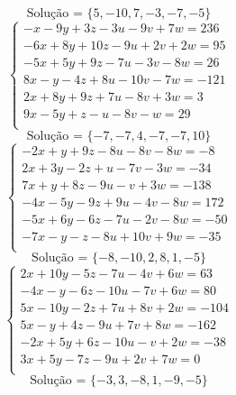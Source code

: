 \documentclass[12pt,oneside,a4paper]{article}
\begin{document}
\begin{equation*}
\text{Solução = }\{5,-10,7,-3,-7,-5\}
\end{equation*}
\vspace{\baselineskip}
\begin{equation*}
\begin{cases}
-x-9y+3z-3u-9v+7w=236 \\
-6x+8y+10z-9u+2v+2w=95 \\
-5x+5y+9z-7u-3v-8w=26 \\
8x-y-4z+8u-10v-7w=-121 \\
2x+8y+9z+7u-8v+3w=3 \\
9x-5y+z-u-8v-w=29 \\
\end{cases}
\end{equation*}
\begin{equation*}
\text{Solução = }\{-7,-7,4,-7,-7,10\}
\end{equation*}
\vspace{\baselineskip}
\begin{equation*}
\begin{cases}
-2x+y+9z-8u-8v-8w=-8 \\
2x+3y-2z+u-7v-3w=-34 \\
7x+y+8z-9u-v+3w=-138 \\
-4x-5y-9z+9u-4v-8w=172 \\
-5x+6y-6z-7u-2v-8w=-50 \\
-7x-y-z-8u+10v+9w=-35 \\
\end{cases}
\end{equation*}
\begin{equation*}
\text{Solução = }\{-8,-10,2,8,1,-5\}
\end{equation*}
\vspace{\baselineskip}
\begin{equation*}
\begin{cases}
2x+10y-5z-7u-4v+6w=63 \\
-4x-y-6z-10u-7v+6w=80 \\
5x-10y-2z+7u+8v+2w=-104 \\
5x-y+4z-9u+7v+8w=-162 \\
-2x+5y+6z-10u-v+2w=-38 \\
3x+5y-7z-9u+2v+7w=0 \\
\end{cases}
\end{equation*}
\begin{equation*}
\text{Solução = }\{-3,3,-8,1,-9,-5\}
\end{equation*}
\end{document}
